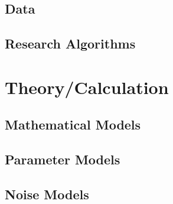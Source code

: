 \subsection{Data}


\subsection{Research Algorithms}


\section{Theory/Calculation}


\subsection{Mathematical Models}


\subsection{Parameter Models}



\subsection{Noise Models}

